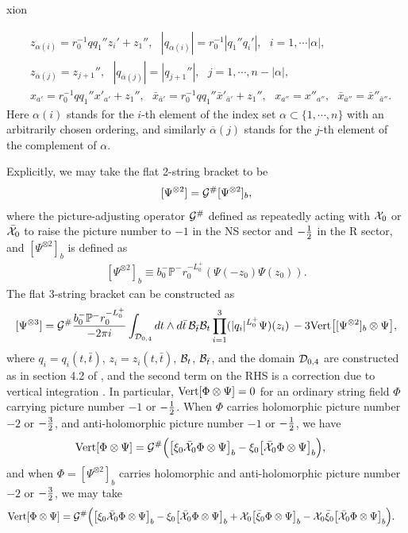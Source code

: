xion\documentclass[12pt]{article}
\def\ie{\begin{equation}\begin{aligned}}
\def\fe{\end{aligned}\end{equation}}
\numberwithin{equation}{section}
\newcommand{\A}{{\alpha}}
\begin{document}
\ie\label{flatmatch}
& z_{\A(i)} = r_0^{-1} q q_1'' z_i' + z_1'',~~~ |q_{\A(i)}| =r_0^{-1} |q_1'' q_i'| ,~~~i = 1,\cdots |\A|,
\\
& z_{\overline\A(j)} = z_{j+1}'',~~~|q_{\overline\A(j)}| = |q_{j+1}''|,~~~j=1,\cdots,n-|\A|,
\\
& x_{a'} =  r_0^{-1}qq_1'' x'_{a'}+z_1'', ~~~ \bar x_{\bar a'} =  r_0^{-1}q q_1'' \bar x'_{\bar a'} + z_1'',~~~x_{a''} = x''_{a''}, ~~~ \bar x_{\bar a''} = \bar x''_{\bar a''}.
\fe
Here $\A(i)$ stands for the $i$-th element of the index set $\A\subset \{1,\cdots, n\}$ with an arbitrarily chosen ordering, and similarly $\overline\A(j)$ stands for the $j$-th element of the complement of $\A$.




Explicitly, we may take the flat 2-string bracket to be
\ie\label{twostringbracksuper}
[\Psi^{\otimes 2}] = {\cal G^\#} [\Psi^{\otimes 2}]_b,
\fe
where the picture-adjusting operator ${\cal G^\#}$ defined as repeatedly acting with ${\cal X}_0$ or $\bar{\cal X}_0$ to raise the picture number to $-1$ in the NS sector and $-{1\over 2}$ in the R sector, and $[\Psi^{\otimes 2}]_b$ is defined as
\ie\label{eqn:2vt}
[\Psi^{\otimes 2}]_b \equiv b_0^-\mathbb{P}^- r_0^{-L_0^+} \left( \Psi(-z_0)  \Psi(z_0) \right).
\fe
The flat 3-string bracket can be constructed as
\ie\label{threestringbracksuper}
[\Psi^{\otimes 3}] = {\cal G^\#}{ b_0^-\mathbb{P}^- r_0^{-L_0^+} \over -2\pi i} \int_{{\cal D}_{0,4}} dt\wedge d\bar t \, {\cal B}_{\bar t} {\cal B}_t \prod_{i=1}^3 (|q_i|^{L_0^+} \Psi)(z_i) \, - 3 {\rm Vert} \big[[\Psi^{\otimes 2}]_b \otimes \Psi\big],
\fe
where $q_i=q_i(t, \bar t)$, $z_i=z_i(t, \bar t)$, ${\cal B}_t$, ${\cal B}_{\bar t}$, and the domain ${\cal D}_{0,4}$ are constructed as in section 4.2 of \cite{Mazel:2024alu}, and the second term on the RHS is a correction due to vertical integration \cite{Sen:2015hia}. In particular, ${\rm Vert}[\Phi\otimes \Psi]=0$ for an ordinary string field $\Phi$ carrying picture number $-1$ or $-{1\over 2}$. When $\Phi$ carries holomorphic picture number $-2$ or $-{3\over 2}$, and anti-holomorphic picture number $-1$ or $-{1\over 2}$, we have
\ie
{\rm Vert}[\Phi\otimes \Psi] &= {\cal G^\#}\Big( \big[ \xi_0 \bar{\cal X}_0 \Phi \otimes \Psi \big]_b - \xi_0 \big[ \bar{\cal X}_0 \Phi\otimes \Psi \big]_b  \Big),
\fe
and when $\Phi=[\Psi^{\otimes 2}]_b$ carries holomorphic and anti-holomorphic picture number $-2$ or $-{3\over 2}$, we may take
\ie
{\rm Vert}[\Phi\otimes \Psi] &= {\cal G^\#}\Big( \big[ \xi_0 \bar{\cal X}_0 \Phi \otimes \Psi \big]_b - \xi_0 \big[ \bar{\cal X}_0 \Phi\otimes \Psi \big]_b + {\cal X}_0 \big[ \bar\xi_0 \Phi\otimes \Psi \big]_b - {\cal X}_0 \bar\xi_0 \big[ \bar{\cal X}_0 \Phi\otimes \Psi \big]_b \Big).
\fe
\end{document}
